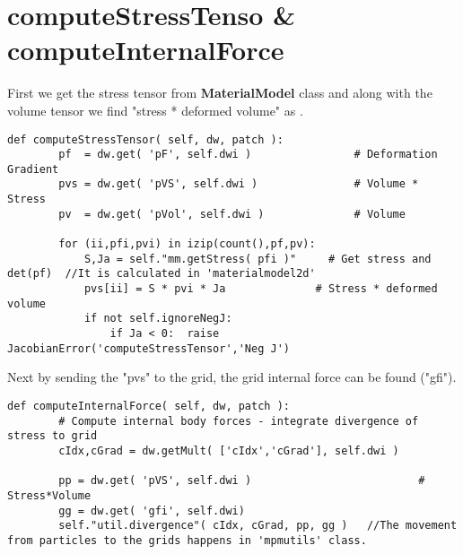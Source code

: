 \section{ computeStressTenso \&  computeInternalForce}
First we get the stress tensor from \textbf{MaterialModel} class and along with the volume tensor we find "stress * deformed volume" as . 
\begin{lstlisting}
def computeStressTensor( self, dw, patch ):    
        pf  = dw.get( 'pF', self.dwi )                # Deformation Gradient
        pvs = dw.get( 'pVS', self.dwi )               # Volume * Stress
        pv  = dw.get( 'pVol', self.dwi )              # Volume
        
        for (ii,pfi,pvi) in izip(count(),pf,pv):
            S,Ja = self."mm.getStress( pfi )"     # Get stress and det(pf)  //It is calculated in 'materialmodel2d'
            pvs[ii] = S * pvi * Ja              # Stress * deformed volume     
            if not self.ignoreNegJ:
                if Ja < 0:  raise JacobianError('computeStressTensor','Neg J')      
\end{lstlisting}
Next by sending the "pvs" to the grid, the grid internal force can be found ("gfi").
\begin{lstlisting}
def computeInternalForce( self, dw, patch ):  
        # Compute internal body forces - integrate divergence of stress to grid
        cIdx,cGrad = dw.getMult( ['cIdx','cGrad'], self.dwi )

        pp = dw.get( 'pVS', self.dwi )                          # Stress*Volume
        gg = dw.get( 'gfi', self.dwi)
        self."util.divergence"( cIdx, cGrad, pp, gg )   //The movement from particles to the grids happens in 'mpmutils' class.
\end{lstlisting}
